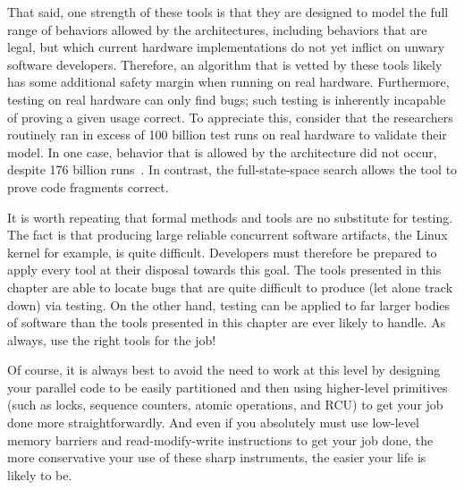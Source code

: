 That said, one strength of these tools is that they are designed to
model the full range of behaviors allowed by the architectures, including
behaviors that are legal, but which current hardware implementations do
not yet inflict on unwary software developers. Therefore, an algorithm
that is vetted by these tools likely has some additional safety margin
when running on real hardware. Furthermore, testing on real hardware can
only find bugs; such testing is inherently incapable of proving a given
usage correct. To appreciate this, consider that the researchers
routinely ran in excess of 100 billion test runs on real hardware to
validate their model.
In one case, behavior that is allowed by the architecture did not occur,
despite 176 billion runs~\cite{JadeAlglave2011ppcmem}.
In contrast, the
full-state-space search allows the tool to prove code fragments correct.

It is worth repeating that formal methods and tools are no substitute for
testing. The fact is that producing large reliable concurrent software
artifacts, the Linux kernel for example, is quite difficult. Developers
must therefore be prepared to apply every tool at their disposal towards
this goal. The tools presented in this chapter are able to locate bugs that
are quite difficult to produce (let alone track down) via testing. On the
other hand, testing can be applied to far larger bodies of software than
the tools presented in this chapter are ever likely to handle. As always,
use the right tools for the job!

Of course, it is always best to avoid the need to work at this level
by designing your parallel code to be easily partitioned and then
using higher-level primitives (such as locks, sequence counters, atomic
operations, and RCU) to get your job done more straightforwardly. And even
if you absolutely must use low-level memory barriers and read-modify-write
instructions to get your job done, the more conservative your use of
these sharp instruments, the easier your life is likely to be.
